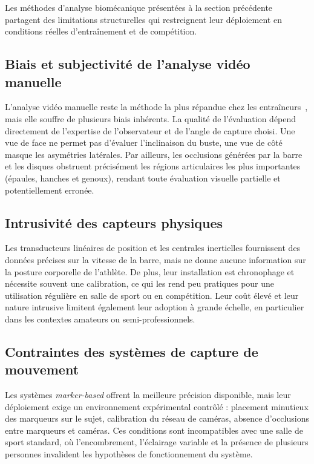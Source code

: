 Les méthodes d'analyse biomécanique présentées à la section précédente partagent des limitations structurelles qui restreignent leur déploiement en conditions réelles d'entraînement et de compétition.

\subsection{Biais et subjectivité de l'analyse vidéo manuelle}

L'analyse vidéo manuelle reste la méthode la plus répandue chez les entraîneurs~\cite{Colyer-2018}, mais elle souffre de plusieurs biais inhérents. La qualité de l'évaluation dépend directement de l'expertise de l'observateur et de l'angle de capture choisi. Une vue de face ne permet pas d'évaluer l'inclinaison du buste, une vue de côté masque les asymétries latérales. Par ailleurs, les occlusions générées par la barre et les disques obstruent précisément les régions articulaires les plus importantes (épaules, hanches et genoux), rendant toute évaluation visuelle partielle et potentiellement erronée.

\subsection{Intrusivité des capteurs physiques}

Les transducteurs linéaires de position et les centrales inertielles fournissent des données précises sur la vitesse de la barre, mais ne donne aucune information sur la posture corporelle de l'athlète. De plus, leur installation est chronophage et nécessite souvent une calibration, ce qui les rend peu pratiques pour une utilisation régulière en salle de sport ou en compétition. Leur coût élevé et leur nature intrusive limitent également leur adoption à grande échelle, en particulier dans les contextes amateurs ou semi-professionnels.

\subsection{Contraintes des systèmes de capture de mouvement}

Les systèmes \textit{marker-based} offrent la meilleure précision disponible, mais leur déploiement exige un environnement expérimental contrôlé : placement minutieux des marqueurs sur le sujet, calibration du réseau de caméras, absence d'occlusions entre marqueurs et caméras. Ces conditions sont incompatibles avec une salle de sport standard, où l'encombrement, l'éclairage variable et la présence de plusieurs personnes invalident les hypothèses de fonctionnement du système.

